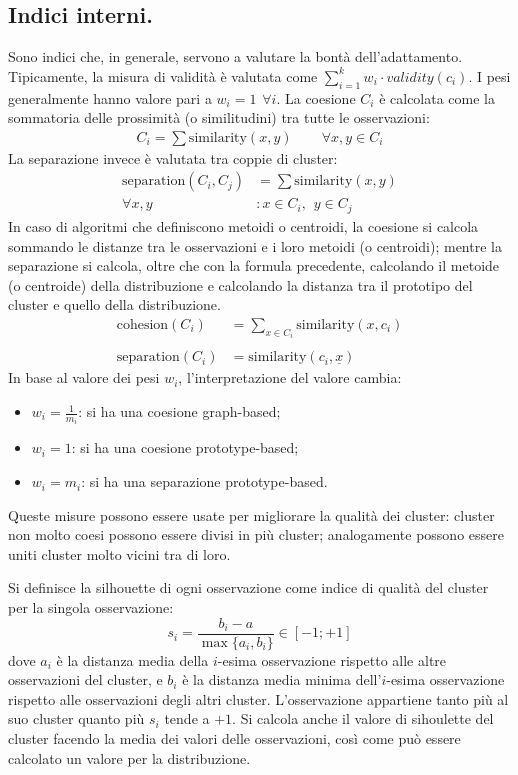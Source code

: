 \documentclass[11pt, a4page, twocolumn]{article}
\begin{document}
\subsection{Indici interni.}
Sono indici che, in generale, servono a valutare la bontà dell'adattamento.
Tipicamente, la misura di validità è valutata come $\sum_{i=1}^{k}{w_i \cdot validity(c_i)}$.
I pesi generalmente hanno valore pari a $w_i = 1 \hspace{5pt} \forall{i}$.
La coesione $C_i$ è calcolata come la sommatoria delle prossimità (o similitudini) tra tutte le osservazioni:
\begin{align*}
  C_i = \sum{\text{similarity}(x, y)} \hspace{25pt} \forall{x, y \in C_i}
\end{align*}
La separazione invece è valutata tra coppie di cluster:
\begin{align*}
  \text{separation}(C_i, C_j) &= \sum{\text{similarity}(x, y)} \\
  \forall x, y &: x \in C_i, \hspace{5pt} y \in C_j
\end{align*}
In caso di algoritmi che definiscono metoidi o centroidi, la coesione si calcola sommando le distanze tra le osservazioni e i loro metoidi (o centroidi); mentre la separazione si calcola, oltre che con la formula precedente, calcolando il metoide (o centroide) della distribuzione e calcolando la distanza tra il prototipo del cluster e quello della distribuzione.
\begin{align*}
  \text{cohesion}(C_i) &= \sum_{x \in C_i}{\text{similarity}(x, c_i)} \\ \\
  \text{separation}(C_i) &= \text{similarity}(c_i, \underline{x})
\end{align*}
In base al valore dei pesi $w_i$, l'interpretazione del valore cambia:
\begin{itemize}
\item $w_i = \frac{1}{m_i}$: si ha una coesione graph-based;
\item $w_i = 1$: si ha una coesione prototype-based;
\item $w_i = m_i$: si ha una separazione prototype-based.
\end{itemize}
Queste misure possono essere usate per migliorare la qualità dei cluster: cluster non molto coesi possono essere divisi in più cluster; analogamente possono essere uniti cluster molto vicini tra di loro.

Si definisce la silhouette di ogni osservazione come indice di qualità del cluster per la singola osservazione:
\begin{equation*}
  s_i = \frac{b_i - a}{\max{\{a_i, b_i\}}} \in [-1; +1]
\end{equation*}
dove $a_i$ è la distanza media della $i$-esima osservazione rispetto alle altre osservazioni del cluster, e $b_i$ è la distanza media minima dell'$i$-esima osservazione rispetto alle osservazioni degli altri cluster.
L'osservazione appartiene tanto più al suo cluster quanto più $s_i$ tende a $+1$.
Si calcola anche il valore di sihoulette del cluster facendo la media dei valori delle osservazioni, così come può essere calcolato un valore per la distribuzione.
\end{document}
